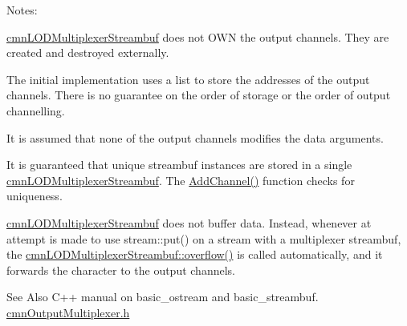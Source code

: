 Notes\-:
\begin{DoxyEnumerate}
\item \hyperlink{classcmn_l_o_d_multiplexer_streambuf}{cmn\-L\-O\-D\-Multiplexer\-Streambuf} does not O\-W\-N the output channels. They are created and destroyed externally.
\item The initial implementation uses a list to store the addresses of the output channels. There is no guarantee on the order of storage or the order of output channelling.
\item It is assumed that none of the output channels modifies the data arguments.
\item It is guaranteed that unique streambuf instances are stored in a single \hyperlink{classcmn_l_o_d_multiplexer_streambuf}{cmn\-L\-O\-D\-Multiplexer\-Streambuf}. The \hyperlink{classcmn_l_o_d_multiplexer_streambuf_a13062543394fee2e08419f0ecad3b5c1}{Add\-Channel()} function checks for uniqueness.
\item \hyperlink{classcmn_l_o_d_multiplexer_streambuf}{cmn\-L\-O\-D\-Multiplexer\-Streambuf} does not buffer data. Instead, whenever at attempt is made to use stream\-::put() on a stream with a multiplexer streambuf, the \hyperlink{classcmn_l_o_d_multiplexer_streambuf_a95173de27f7abc67614838d79858c5bf}{cmn\-L\-O\-D\-Multiplexer\-Streambuf\-::overflow()} is called automatically, and it forwards the character to the output channels.
\end{DoxyEnumerate}

\begin{DoxySeeAlso}{See Also}
C++ manual on basic\-\_\-ostream and basic\-\_\-streambuf. \hyperlink{cmn_output_multiplexer_8h}{cmn\-Output\-Multiplexer.\-h} 
\end{DoxySeeAlso}


